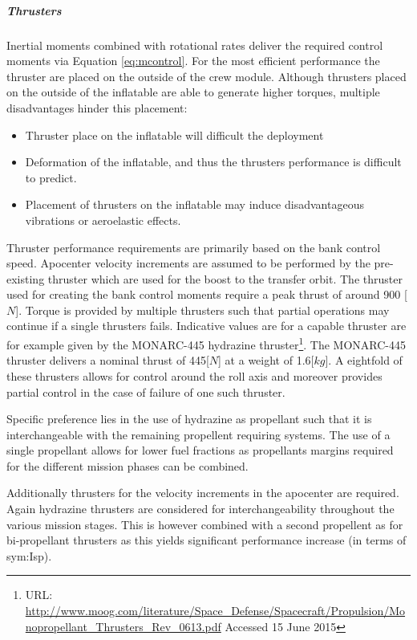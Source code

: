 \subparagraph{Thrusters}

Inertial moments combined with rotational rates deliver the required control moments via Equation \ref{eq:mcontrol}. For the most efficient performance the thruster are placed on the outside of the crew module. Although thrusters placed on the outside of the inflatable are able to generate higher torques, multiple disadvantages hinder this placement:

\begin{itemize}
\item Thruster place on the inflatable will difficult the deployment
\item Deformation of the inflatable, and thus the thrusters performance is difficult to predict.
\item Placement of thrusters on the inflatable may induce disadvantageous vibrations or aeroelastic effects.  
\end{itemize} 

Thruster performance requirements are primarily based on the bank control speed. Apocenter velocity increments are assumed to be performed by the pre-existing thruster which are used for the boost to the transfer orbit. The thruster used for creating the bank control moments require a peak thrust of around 900 [$N$]. Torque is provided by multiple thrusters such that partial operations may continue if a single thrusters fails.
 Indicative values are for a capable thruster are for example given by the  MONARC-445 hydrazine thruster\footnote{URL: \url{http://www.moog.com/literature/Space\_Defense/Spacecraft/Propulsion/Monopropellant\_Thrusters\_Rev\_0613.pdf} Accessed 15 June 2015}. The MONARC-445 thruster delivers a nominal thrust of 445[$N$] at a weight of 1.6[$kg$].  A eightfold of these thrusters allows for control around the roll axis and moreover provides partial control in the case of failure of one such thruster.
 
 
Specific preference lies in the use of hydrazine as propellant such that it is interchangeable with the remaining propellent requiring systems. The use of a single propellant allows for lower fuel fractions as propellants margins required for the different mission phases can be combined.

Additionally thrusters for the velocity increments in the apocenter are required. Again hydrazine thrusters are considered for interchangeability throughout the various mission stages. This is however combined with a second propellent as for bi-propellant thrusters as this yields significant performance increase (in terms of \gls{sym:Isp})\cite{Wertz2011}. 

